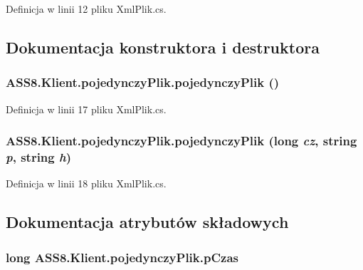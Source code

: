 Definicja w linii 12 pliku XmlPlik.cs.

\subsection{Dokumentacja konstruktora i destruktora}
\hypertarget{a00020_1b44b61561b4931cdb3229a9709675e3}{
\subsubsection[{pojedynczyPlik}]{\setlength{\rightskip}{0pt plus 5cm}ASS8.Klient.pojedynczyPlik.pojedynczyPlik ()}}
\label{db/db2/a00020_1b44b61561b4931cdb3229a9709675e3}




Definicja w linii 17 pliku XmlPlik.cs.\hypertarget{a00020_d818288fef4645e6b690b3d055e20ecb}{
\subsubsection[{pojedynczyPlik}]{\setlength{\rightskip}{0pt plus 5cm}ASS8.Klient.pojedynczyPlik.pojedynczyPlik (long {\em cz}, \/  string {\em p}, \/  string {\em h})}}
\label{db/db2/a00020_d818288fef4645e6b690b3d055e20ecb}




Definicja w linii 18 pliku XmlPlik.cs.

\subsection{Dokumentacja atrybutów składowych}
\hypertarget{a00020_bf6c0b5909ca7cd5b160047a425197dc}{
\subsubsection[{pCzas}]{\setlength{\rightskip}{0pt plus 5cm}long {\bf ASS8.Klient.pojedynczyPlik.pCzas}}}
\label{db/db2/a00020_bf6c0b5909ca7cd5b160047a425197dc}




